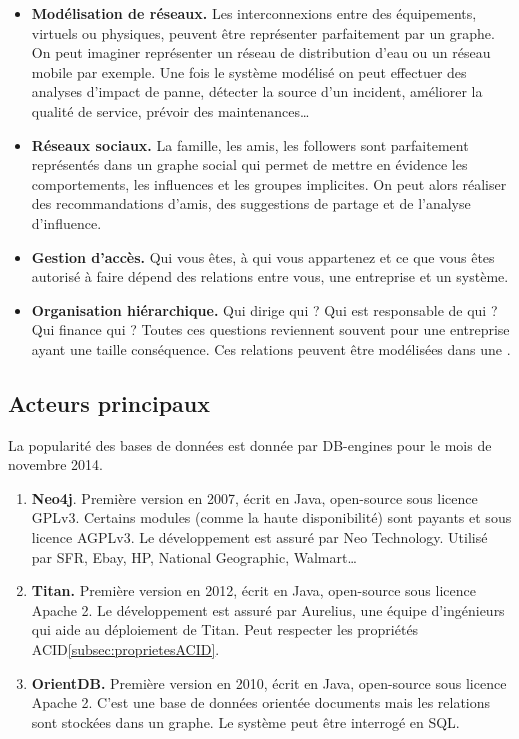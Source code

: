 	\begin{itemize}
	 	\item \textbf{Modélisation de réseaux.} Les interconnexions entre des équipements, virtuels ou physiques, peuvent être représenter parfaitement par un graphe. On peut imaginer représenter un réseau de distribution d'eau ou un réseau mobile par exemple. Une fois le système modélisé on peut effectuer des analyses d'impact de panne, détecter la source d'un incident, améliorer la qualité de service, prévoir des maintenances\dots
	 	\item \textbf{Réseaux sociaux.} La famille, les amis, les followers sont parfaitement représentés dans un graphe social qui permet de mettre en évidence les comportements, les influences et les groupes implicites. On peut alors réaliser des recommandations d'amis, des suggestions de partage et de l'analyse d'influence.
	 	\item \textbf{Gestion d'accès.} Qui vous êtes, à qui vous appartenez et ce que vous êtes autorisé à faire dépend des relations entre vous, une entreprise et un système.
	 	\item \textbf{Organisation hiérarchique.} Qui dirige qui ? Qui est responsable de qui ? Qui finance qui ? Toutes ces questions reviennent souvent pour une entreprise ayant une taille conséquence. Ces relations peuvent être modélisées dans une \bddGraphe{}.
	 \end{itemize} 

\subsection{Acteurs principaux}
	La popularité des bases de données est donnée par DB-engines\cite{db_engines_key_value} pour le mois de novembre 2014.

	\begin{enumerate}
		\item \textbf{Neo4j}. Première version en 2007, écrit en Java, open-source sous licence GPLv3. Certains modules (comme la haute disponibilité) sont payants et sous licence AGPLv3. Le développement est assuré par Neo Technology. Utilisé par SFR, Ebay, HP, National Geographic, Walmart\dots
		\item \textbf{Titan.} Première version en 2012, écrit en Java, open-source sous licence Apache 2. Le développement est assuré par Aurelius, une équipe d'ingénieurs qui aide au déploiement de Titan. Peut respecter les propriétés ACID\ref{subsec:proprietesACID}.
		\item \textbf{OrientDB.} Première version en 2010, écrit en Java, open-source sous licence Apache 2. C'est une base de données orientée documents mais les relations sont stockées dans un graphe. Le système peut être interrogé en SQL.
	\end{enumerate}
